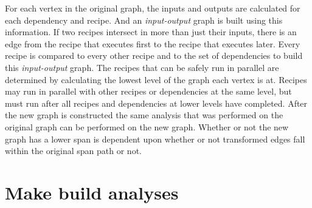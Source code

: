 \documentclass[sigconf,10pt,review,authorversion]{acmart}\settopmatter{printfolios=true,printccs=false,printacmref=false}
\begin{document}
For each vertex in the original graph, the inputs and outputs are calculated for each
dependency and recipe.  And an \emph{input-output} graph is built using this information.  If two
recipes intersect in more than just their inputs, there is an edge from the recipe that executes
first to the recipe that executes later.  Every recipe is compared to every other recipe and to
the set of dependencies to build this \emph{input-output} graph.  The recipes that can be safely
run in parallel are determined by calculating the lowest level of the graph each vertex is at.
Recipes may run in parallel with other recipes or dependencies at the same level, but must run
after all recipes and dependencies at lower levels have completed.  After the new graph is
constructed the same analysis that was performed on the original graph can be performed on the
new graph.  Whether or not the new graph has a lower span is dependent upon whether or not
transformed edges fall within the original span path or not.




\section{Make build analyses}
\label{sec:realanalyses}
\end{document}

